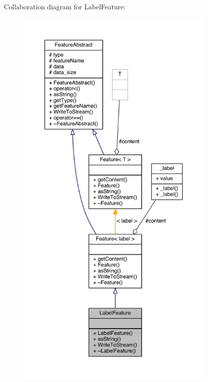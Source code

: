 Collaboration diagram for Label\+Feature\+:\nopagebreak
\begin{figure}[H]
\begin{center}
\leavevmode
\includegraphics[height=550pt]{class_label_feature__coll__graph}
\end{center}
\end{figure}


